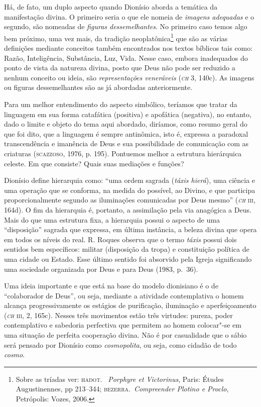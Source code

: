 {Há, de fato, um duplo aspecto quando Dionísio aborda a temática da
manifestação divina. O primeiro seria o que ele nomeia de
\emph{imagens adequadas} e o segundo, são nomeadas de \emph{figuras
dessemelhantes}. No primeiro caso temos algo bem próximo, uma vez mais,
da tradição neoplatônica\footnote{ Sobre as tríadas ver: \textsc{hadot}.~%
\emph{Porphyre et Victorinus}, Paris: Études Augustinennes, pp
213--344; \textsc{bezerra}.~\emph{Compreender Plotino e Proclo},
Petrópolis: Vozes, 2006.} que são as várias definições mediante
conceitos também encontrados nos textos bíblicos tais como: Razão,
Inteligência, Substância, Luz, Vida. Nesse caso, embora inadequados do
ponto de vista da natureza divina, posto que Deus não pode ser reduzido
a nenhum conceito ou ideia, são \emph{representações veneráveis} (\emph{\textsc{ch
}}3, 140c). As imagens ou figuras dessemelhantes são as já abordadas
anteriormente. 

Para um melhor entendimento do aspecto simbólico, teríamos que tratar
da linguagem em sua forma catafática (positiva) e apofática (negativa),
no entanto, dado o limite e objeto do tema aqui abordado, diríamos,
como resumo geral do que foi dito, que a linguagem é sempre antinômica,
isto é, expressa a paradoxal transcendência e imanência de Deus e sua
possibilidade de comunicação com as criaturas (\textsc{scazzoso}, 1976, p. 195).
Pontuemos melhor a estrutura hierárquica celeste. Em que consiste?
Quais suas mediações e funções? 

Dionísio define hierarquia como: ``uma ordem sagrada
(\emph{táxis hierá}), uma ciência e uma operação que se
conforma, na medida do possível, ao Divino, e que participa
proporcionalmente segundo as iluminações comunicadas por Deus mesmo''
(\emph{\textsc{ch}} \textsc{iii}, 164d). O fim da hierarquia é, portanto, a assimilação
pela via anagógica a Deus. Mais do que uma estrutura fixa, a hierarquia
possui o aspecto de uma “disposição” sagrada que expressa, em última
instância, a beleza divina que opera em todos os níveis do real. R.
Roques observa que o termo \emph{táxis} possui dois sentidos bem
específicos: militar (disposição da tropa) e constituição política de
uma cidade ou Estado. Esse último sentido foi absorvido pela Igreja
significando uma sociedade organizada por Deus e para Deus (1983,
p.~36). 

 Uma ideia importante e que está na base do modelo dionisiano é o de
``colaborador de Deus'', ou seja, mediante a atividade contemplativa o homem alcança
progressivamente os estágios de purificação, iluminação e
aperfeiçoamento (\emph{\textsc{ch}} \textsc{iii}, 2, 165c). Nesses três movimentos
estão três virtudes: pureza, poder contemplativo e sabedoria perfectiva
que permitem ao homem colocar"-se em uma situação de perfeita cooperação
divina. Não é por casualidade que o sábio será pensado por Dionísio
como \emph{cosmopolita}, ou seja, como cidadão de todo
\emph{cosmo}. 

}
